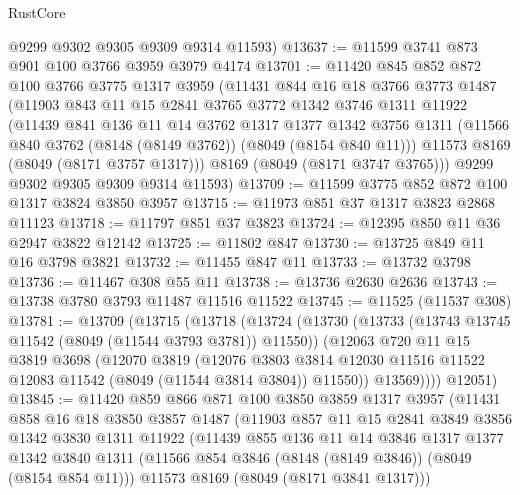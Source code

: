 \begin{lexlean}{RustCore}
\begin{coremodule}
      @9299
      @9302
      @9305
      @9309
      @9314
      @11593)
@13637 := @11599 @3741 @873 @901 @100 @3766 @3959 @3979 @4174
@13701 := @11420
    @845
    @852
    @872
    @100
    @3766
    @3775
    @1317
    @3959
    (@11431
      @844
      @16
      @18
      @3766
      @3773
      @1487
      (@11903
        @843
        @11
        @15
        @2841
        @3765
        @3772
        @1342
        @3746
        @1311
        @11922
        (@11439
          @841
          @136
          @11
          @14
          @3762
          @1317
          @1377
          @1342
          @3756
          @1311
          (@11566 @840 @3762 (@8148 (@8149 @3762)) (@8049 (@8154 @840 @11)))
          @11573
          @8169
          (@8049 (@8171 @3757 @1317)))
        @8169
        (@8049 (@8171 @3747 @3765)))
      @9299
      @9302
      @9305
      @9309
      @9314
      @11593)
@13709 := @11599 @3775 @852 @872 @100 @1317 @3824 @3850 @3957
@13715 := @11973 @851 @37 @1317 @3823 @2868 @11123
@13718 := @11797 @851 @37 @3823
@13724 := @12395 @850 @11 @36 @2947 @3822 @12142
@13725 := @11802 @847
@13730 := @13725 @849 @11 @16 @3798 @3821
@13732 := @11455 @847 @11
@13733 := @13732 @3798
@13736 := @11467 @308 @55 @11
@13738 := @13736 @2630 @2636
@13743 := @13738 @3780 @3793 @11487 @11516 @11522
@13745 := @11525 (@11537 @308)
@13781 := @13709
    (@13715
      (@13718
        (@13724
          (@13730
            (@13733 (@13743 @13745 @11542 (@8049 (@11544 @3793 @3781)) @11550))
            (@12063
              @720
              @11
              @15
              @3819
              @3698
              (@12070
                @3819
                (@12076
                  @3803
                  @3814
                  @12030
                  @11516
                  @11522
                  @12083
                  @11542
                  (@8049 (@11544 @3814 @3804))
                  @11550))
              @13569))))
      @12051)
@13845 := @11420
    @859
    @866
    @871
    @100
    @3850
    @3859
    @1317
    @3957
    (@11431
      @858
      @16
      @18
      @3850
      @3857
      @1487
      (@11903
        @857
        @11
        @15
        @2841
        @3849
        @3856
        @1342
        @3830
        @1311
        @11922
        (@11439
          @855
          @136
          @11
          @14
          @3846
          @1317
          @1377
          @1342
          @3840
          @1311
          (@11566 @854 @3846 (@8148 (@8149 @3846)) (@8049 (@8154 @854 @11)))
          @11573
          @8169
          (@8049 (@8171 @3841 @1317)))

\end{coremodule}
\end{lexlean}

